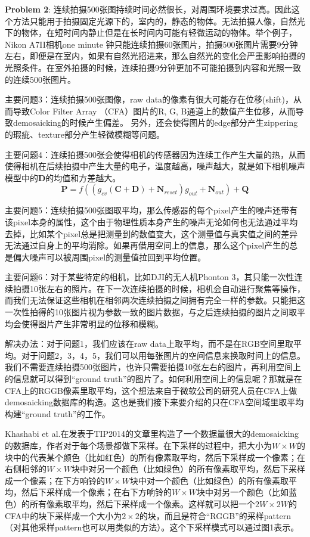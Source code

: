 \documentclass[10pt,twocolumn,letterpaper]{article}
\begin{document}
\textbf{Problem 2}: 连续拍摄500张图持续时间必然很长，对周围环境要求过高。因此这个方法只能用于拍摄固定光源下的，室内的，静态的物体。无法拍摄人像，自然光下的物体，在短时间内静止但是在长时间内可能有轻微运动的物体。举个例子，Nikon A7II相机one minute 钟只能连续拍摄60张图片，拍摄500张图片需要9分钟左右，即便是在室内，如果有自然光招进来，那么自然光的变化会严重影响拍摄的光照条件。在室外拍摄的时候，连续拍摄9分钟更加不可能拍摄到内容和光照一致的连续500张图片。

主要问题3：连续拍摄500张图像，raw data的像素有很大可能存在位移(shift)，从而导致Color Filter Array （CFA）图片的R, G, B通道上的数值产生位移，从而导致demosaicking的时候产生偏差。 另外，还会使得图片的edge部分产生zippering的瑕疵、texture部分产生轻微模糊等问题。

主要问题4：连续拍摄500张会使得相机的传感器因为连续工作产生大量的热，从而使得相机在后续拍摄中产生大量的电子，温度越高，噪声越大，就是如下相机噪声模型中的$\bm{D}$的均值和方差越大。
\begin{equation}
\bm{P} = f((g_{cv}(\bm{C}+\bm{D})+\bm{N}_{reset})g_{out}+\bm{N}_{out})+\bm{Q}
\end{equation}

主要问题5：连续拍摄500张图取平均，那么传感器的每个pixel产生的噪声还带有该pixel本身的属性，这个由于物理性质本身产生的噪声无论如何也无法通过平均去掉，比如某个pixel总是把测量到的数值变大，这个测量值与真实值之间的差异无法通过自身上的平均消除。如果再借用空间上的信息，那么这个pixel产生的总是偏大噪声可以被周围pixel的测量值拉回到平均位置。


主要问题6：对于某些特定的相机，比如DJI的无人机Phonton 3，其只能一次性连续拍摄10张左右的照片。在下一次连续拍摄的时候，相机会自动进行聚焦等操作，而我们无法保证这些相机在相邻两次连续拍摄之间拥有完全一样的参数。只能把这一次性拍得的10张图片视为参数一致的图片数据，与之后连续拍摄的图片之间取平均会使得图片产生非常明显的位移和模糊。


解决办法：对于问题1，我们应该在raw data上取平均，而不是在RGB空间里取平均。对于问题2，3，4，5，我们可以用每张图片的空间信息来换取时间上的信息。我们不需要连续拍摄500张图片，也许只需要拍摄10张左右的图片，再利用空间上的信息就可以得到``ground truth''的图片了。如何利用空间上的信息呢？那就是在CFA上的RGGB像素里取平均，这个想法来自于微软公司的研究人员在CFA上做demosaicking数据库的构造\cite{khashabi2014joint}。这也是我们接下来要介绍的只在CFA空间域里取平均构建``ground truth''的工作。


Khashabi et al.在发表于TIP2014的文章\cite{khashabi2014joint}里构造了一个数据量很大的demosaicking的数据库，作者对于每个场景都做下采样。在下采样的过程中，把大小为$W\times W$的块中的代表某个颜色（比如红色）的所有像素取平均，然后下采样成一个像素；在右侧相邻的$W\times W$块中对另一个颜色（比如绿色）的所有像素取平均，然后下采样成一个像素；在下方响铃的$W\times W$块中对一个颜色（比如绿色）的所有像素取平均，然后下采样成一个像素；在右下方响铃的$W\times W$块中对另一个颜色（比如蓝色）的所有像素取平均，然后下采样成一个像素。这样就可以把一个$2W\times2W$的CFA中的块下采样成一个大小为$2\times2$的块，而且是符合``RGGB''的采样pattern（对其他采样pattern也可以用类似的方法）。这个下采样模式可以通过图1表示。
\end{document}
